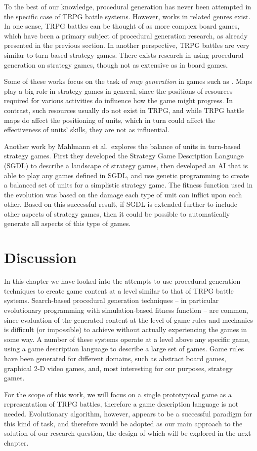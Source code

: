 To the best of our knowledge, procedural generation has never been attempted in the specific case of TRPG battle systems. However, works in related genres exist. In one sense, TRPG battles can be thought of as more complex board games, which have been a primary subject of procedural generation research, as already presented in the previous section. In another perspective, TRPG battles are very similar to turn-based strategy games. There exists research in using procedural generation on strategy games, though not as extensive as in board games.

Some of these works\cites{togelius2010multiobjective, liapis2013generating} focus on the task of \textit{map generation} in games such as . Maps play a big role in strategy games in general, since the positions of resources required for various activities do influence how the game might progress. In contrast, such resources usually do not exist in TRPG, and while TRPG battle maps do affect the positioning of units, which in turn could affect the effectiveness of units' skills, they are not as influential.

Another work by Mahlmann et al.\cite{mahlmann2011towards}\ explores the balance of units in turn-based strategy games. First they developed the Strategy Game Description Language (SGDL) to describe a landscape of strategy games, then developed an AI that is able to play any games defined in SGDL, and use genetic programming to create a balanced set of units for a simplistic strategy game. The fitness function used in the evolution was based on the damage each type of unit can inflict upon each other. Based on this successful result, if SGDL is extended further to include other aspects of strategy games, then it could be possible to automatically generate all aspects of this type of games.

\section{Discussion}

In this chapter we have looked into the attempts to use procedural generation techniques to create game content at a level similar to that of TRPG battle systems. Search-based procedural generation techniques -- in particular evolutionary programming with simulation-based fitness function -- are common, since evaluation of the generated content at the level of game rules and mechanics is difficult (or impossible) to achieve without actually experiencing the games in some way.\cite{togelius2010search} A number of these systems operate at a level above any specific game, using a game description language to describe a large set of games. Game rules have been generated for different domains, such as abstract board games, graphical 2-D video games, and, most interesting for our purposes, strategy games.

For the scope of this work, we will focus on a single prototypical game as a representation of TRPG battles, therefore a game description language is not needed. Evolutionary algorithm, however, appears to be a successful paradigm for this kind of task, and therefore would be adopted as our main approach to the solution of our research question, the design of which will be explored in the next chapter.